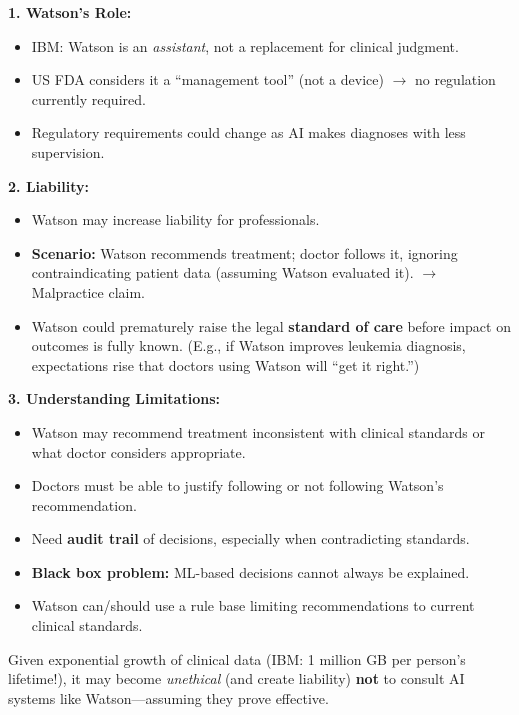 \begin{exbox}
\textbf{1. Watson's Role:}
\begin{itemize}
  \item IBM: Watson is an \textit{assistant}, not a replacement for clinical judgment.
  \item US FDA considers it a ``management tool'' (not a device) $\to$ no regulation currently required.
  \item Regulatory requirements could change as AI makes diagnoses with less supervision.
\end{itemize}

\textbf{2. Liability:}
\begin{itemize}
  \item Watson may increase liability for professionals.
  \item \textbf{Scenario:} Watson recommends treatment; doctor follows it, ignoring contraindicating patient data (assuming Watson evaluated it). $\to$ Malpractice claim.
  \item Watson could prematurely raise the legal \textbf{standard of care} before impact on outcomes is fully known. (E.g., if Watson improves leukemia diagnosis, expectations rise that doctors using Watson will ``get it right.'')
\end{itemize}

\textbf{3. Understanding Limitations:}
\begin{itemize}
  \item Watson may recommend treatment inconsistent with clinical standards or what doctor considers appropriate.
  \item Doctors must be able to justify following or not following Watson's recommendation.
  \item Need \textbf{audit trail} of decisions, especially when contradicting standards.
  \item \textbf{Black box problem:} ML-based decisions cannot always be explained.
  \item Watson can/should use a rule base limiting recommendations to current clinical standards.
\end{itemize}
\end{exbox}

\begin{tipbox}
Given exponential growth of clinical data (IBM: 1 million GB per person's lifetime!), it may become \textit{unethical} (and create liability) \textbf{not} to consult AI systems like Watson---assuming they prove effective.
\end{tipbox}

